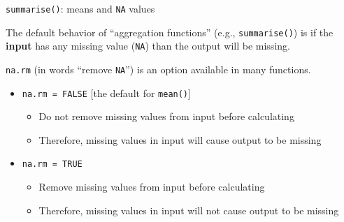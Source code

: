 \documentclass[8pt,ignorenonframetext,dvipsnames]{beamer}
\newenvironment{Shaded}{\begin{snugshade}}{\end{snugshade}}
\newcommand{\KeywordTok}[1]{\textcolor[rgb]{0.13,0.29,0.53}{\textbf{#1}}}
\newcommand{\DataTypeTok}[1]{\textcolor[rgb]{0.13,0.29,0.53}{#1}}
\newcommand{\StringTok}[1]{\textcolor[rgb]{0.31,0.60,0.02}{#1}}
\newcommand{\CommentTok}[1]{\textcolor[rgb]{0.56,0.35,0.01}{\textit{#1}}}
\newcommand{\OtherTok}[1]{\textcolor[rgb]{0.56,0.35,0.01}{#1}}
\newcommand{\OperatorTok}[1]{\textcolor[rgb]{0.81,0.36,0.00}{\textbf{#1}}}
\newcommand{\NormalTok}[1]{#1}
\providecommand{\tightlist}{%
  \setlength{\itemsep}{0pt}\setlength{\parskip}{0pt}}
\renewcommand{\textbf}[1]{{\color{darkgray}\bfseries\fontfamily{Montserrat-TOsF}#1}}
\begin{document}
\begin{frame}[fragile]{\texttt{summarise()}: means and \texttt{NA}
values}

The default behavior of ``aggregation functions'' (e.g.,
\texttt{summarise()}) is if the \textbf{input} has any missing value
(\texttt{NA}) than the output will be missing.

\texttt{na.rm} (in words ``remove \texttt{NA}'') is an option available
in many functions.

\begin{itemize}
\tightlist
\item
  \texttt{na.rm\ =\ FALSE} {[}the default for \texttt{mean()}{]}

  \begin{itemize}
  \tightlist
  \item
    Do not remove missing values from input before calculating
  \item
    Therefore, missing values in input will cause output to be missing
  \end{itemize}
\item
  \texttt{na.rm\ =\ TRUE}

  \begin{itemize}
  \tightlist
  \item
    Remove missing values from input before calculating
  \item
    Therefore, missing values in input will not cause output to be
    missing
  \end{itemize}
\end{itemize}

\begin{Shaded}
\end{Shaded}


\end{frame}
\end{document}
